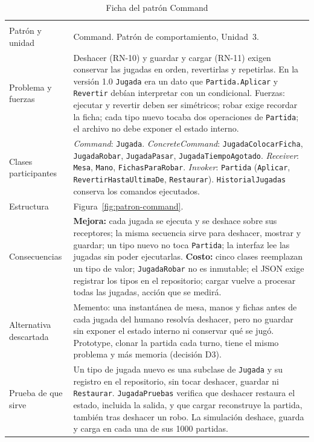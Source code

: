 {\small{}\renewcommand{\arraystretch}{1.2}
\begin{longtable}{@{}L{3.1cm}L{11.4cm}@{}}
  \caption{Ficha del patrón Command}\label{tab:ficha-command}\\
  \toprule
   &  \\ \midrule \endfirsthead
  \toprule
   &  \\ \midrule \endhead
  \bottomrule \endlastfoot
  Patrón y unidad & Command. Patrón de comportamiento, Unidad~3. \\ \filasep
  Problema y fuerzas & Deshacer (RN-10) y guardar y cargar (RN-11) exigen conservar las jugadas en orden, revertirlas y repetirlas. En la versión 1.0 \texttt{Jugada} era un dato que \texttt{Partida.Aplicar} y \texttt{Revertir} debían interpretar con un condicional. Fuerzas: ejecutar y revertir deben ser simétricos; robar exige recordar la ficha; cada tipo nuevo tocaba dos operaciones de \texttt{Partida}; el archivo no debe exponer el estado interno. \\ \filasep
  Clases participantes & \emph{Command}: \texttt{Jugada}. \emph{ConcreteCommand}: \texttt{JugadaColocarFicha}, \texttt{JugadaRobar}, \texttt{JugadaPasar}, \texttt{JugadaTiempoAgotado}. \emph{Receiver}: \texttt{Mesa}, \texttt{Mano}, \texttt{FichasParaRobar}. \emph{Invoker}: \texttt{Partida} (\texttt{Aplicar}, \texttt{RevertirHastaUltimaDe}, \texttt{Restaurar}). \texttt{HistorialJugadas} conserva los comandos ejecutados. \\ \filasep
  Estructura & Figura~\ref{fig:patron-command}. \\ \filasep
  Consecuencias & \textbf{Mejora:} cada jugada se ejecuta y se deshace sobre sus receptores; la misma secuencia sirve para deshacer, mostrar y guardar; un tipo nuevo no toca \texttt{Partida}; la interfaz lee las jugadas sin poder ejecutarlas. \textbf{Costo:} cinco clases reemplazan un tipo de valor; \texttt{JugadaRobar} no es inmutable; el JSON exige registrar los tipos en el repositorio; cargar vuelve a procesar todas las jugadas, acción que se medirá. \\ \filasep
  Alternativa descartada & Memento: una instantánea de mesa, manos y fichas antes de cada jugada del humano resolvía deshacer, pero no guardar sin exponer el estado interno ni conservar qué se jugó. Prototype, clonar la partida cada turno, tiene el mismo problema y más memoria (decisión D3). \\ \filasep
  Prueba de que sirve & Un tipo de jugada nuevo es una subclase de \texttt{Jugada} y su registro en el repositorio, sin tocar deshacer, guardar ni \texttt{Restaurar}. \texttt{JugadaPruebas} verifica que deshacer restaura el estado, incluida la salida, y que cargar reconstruye la partida, también tras deshacer un robo. La simulación deshace, guarda y carga en cada una de sus 1000 partidas. \\
\end{longtable}}

